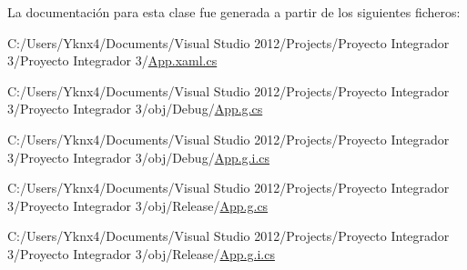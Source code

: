 La documentación para esta clase fue generada a partir de los siguientes ficheros\-:\begin{DoxyCompactItemize}
\item 
C\-:/\-Users/\-Yknx4/\-Documents/\-Visual Studio 2012/\-Projects/\-Proyecto Integrador 3/\-Proyecto Integrador 3/\hyperlink{_app_8xaml_8cs}{App.\-xaml.\-cs}\item 
C\-:/\-Users/\-Yknx4/\-Documents/\-Visual Studio 2012/\-Projects/\-Proyecto Integrador 3/\-Proyecto Integrador 3/obj/\-Debug/\hyperlink{_debug_2_app_8g_8cs}{App.\-g.\-cs}\item 
C\-:/\-Users/\-Yknx4/\-Documents/\-Visual Studio 2012/\-Projects/\-Proyecto Integrador 3/\-Proyecto Integrador 3/obj/\-Debug/\hyperlink{_debug_2_app_8g_8i_8cs}{App.\-g.\-i.\-cs}\item 
C\-:/\-Users/\-Yknx4/\-Documents/\-Visual Studio 2012/\-Projects/\-Proyecto Integrador 3/\-Proyecto Integrador 3/obj/\-Release/\hyperlink{_release_2_app_8g_8cs}{App.\-g.\-cs}\item 
C\-:/\-Users/\-Yknx4/\-Documents/\-Visual Studio 2012/\-Projects/\-Proyecto Integrador 3/\-Proyecto Integrador 3/obj/\-Release/\hyperlink{_release_2_app_8g_8i_8cs}{App.\-g.\-i.\-cs}\end{DoxyCompactItemize}
